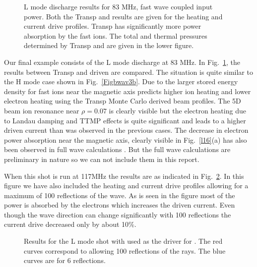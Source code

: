  \begin{figure}
 \centering   
\begin{narrow}{-0.40in}{0in}
 \mbox{}
\end{narrow}
 \mbox{}
 \caption{L mode discharge results for 83 MHz, fast wave coupled
   input power. Both the Transp and \ot results are given for the
   heating and current drive profiles. Transp has significantly more
   power absorption by the fast ions. The total and thermal pressures
  determined by Transp and \ot are given in the lower figure. } 
  \label{Figbwav3d}
 \end{figure}
   Our final example consists of the L mode discharge at 83
   MHz. In Fig.~\ref{Figbwav3d}, the results between Transp and \ot
   driven \ct are compared. The situation is quite similar to the
   H mode case shown in Fig.~\ref{Figbwav3b}. Due to the larger
   stored energy density for fast ions near the magnetic axis \ct 
   predicts higher ion heating and lower electron heating using the
   Transp Monte Carlo derived beam profiles. The 5D beam ion
   resonance near $\rho = 0.07 $ is clearly visible but the 
   electron heating due to Landau damping and TTMP effects is quite
   significant and leads to a higher driven current than was observed
   in the previous cases. The decrease in electron power absorption
   near the magnetic axis, clearly visible in Fig.~\ref{l16}(a) has also been
   observed in full wave calculations \cite{b1}. But the  full wave
   calculations are preliminary in nature so we  can not include them 
   in this report. 

    When this shot is run at 117MHz the results are as indicated in 
   Fig.~\ref{Figbwav3e}.  In this figure we have also included the
  heating and current drive profiles allowing for a maximum of 100
  reflections of the wave. As is seen in the figure most of the power
  is absorbed by the electrons which increases the driven current.
   Even though  the wave direction can change significantly
   with 100 reflections the current drive decreased only by about 10\%.
 \begin{figure}
 \centering   
\begin{narrow}{-0.40in}{0in}
 \mbox{}
\end{narrow}
 \caption{Results for the L mode shot with \ot used as the driver for
   \ct. The red curves correspond to allowing 100 reflections of the
   rays.  The blue curves are for 6 reflections.}
  \label{Figbwav3e}
 \end{figure}



